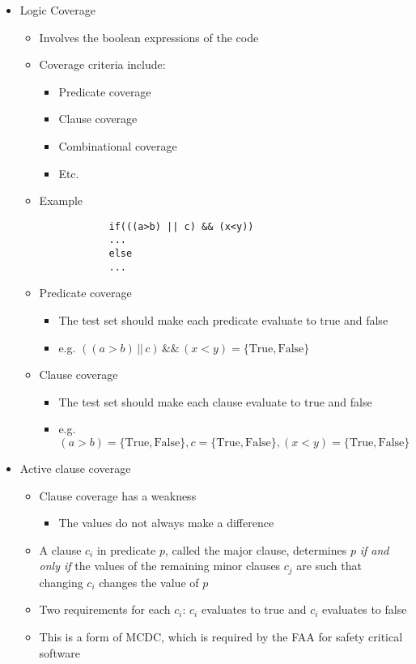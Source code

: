 \begin{itemize}
	\item Logic Coverage
	\begin{itemize}
		\item Involves the boolean expressions of the code
		\item Coverage criteria include:
		\begin{itemize}
			\item Predicate coverage
			\item Clause coverage
			\item Combinational coverage
			\item Etc.
		\end{itemize}
		\item Example
		\begin{Verbatim}
			if(((a>b) || c) && (x<y))
			...
			else
			...
		\end{Verbatim}
		\item Predicate coverage
		\begin{itemize}
			\item The test set should make each predicate evaluate to true and false
			\item e.g. $ ((a>b) \, || \, c) \, \&\& \, (x<y) = \{\text{True}, \text{False}\} $
		\end{itemize}
		\item Clause coverage
		\begin{itemize}
			\item The test set should make each clause evaluate to true and false
			\item e.g. $ (a>b) = \{\text{True}, \text{False}\}, c = \{\text{True}, \text{False}\}, (x<y) = \{\text{True}, \text{False}\} $
		\end{itemize}
	\end{itemize}

	\item Active clause coverage
	\begin{itemize}
		\item Clause coverage has a weakness
		\begin{itemize}
			\item The values do not always make a difference
		\end{itemize}
		\item A clause $ c_i$ in predicate $ p $, called the major clause, determines $ p $ \textit{if and only if} the values of the remaining minor clauses $ c_j $ are such that changing $ c_i $ changes the value of $ p $
		\item Two requirements for each $ c_i $: $ c_i $ evaluates to true and $ c_i $ evaluates to false
		\item This is a form of MCDC, which is required by the FAA for safety critical
		software


\end{itemize}
\end{itemize}

